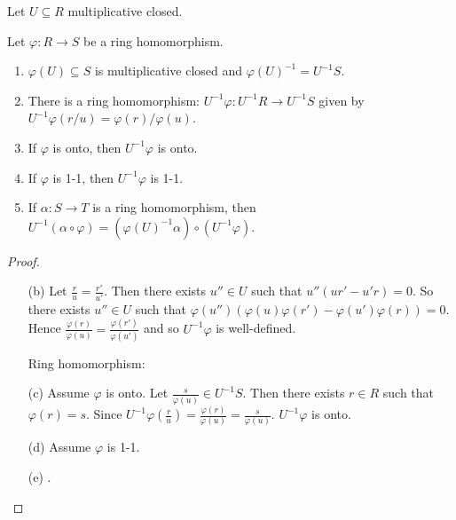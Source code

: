 Let $U \subseteq R$ multiplicative closed.

\begin{proposition}
    Let $\varphi: R \to S$ be a ring homomorphism.
    \begin{enumerate}
        \item $\varphi(U) \subseteq S$ is multiplicative closed and $\varphi(U)^{-1} = U^{-1}S$.
        \item There is a ring homomorphism: $U^{-1}\varphi: U^{-1}R \to U^{-1}S$ given by $U^{-1}\varphi(r/u) = \varphi(r)/\varphi(u)$.
            \begin{center}
            \end{center}
        \item If $\varphi$ is onto, then $U^{-1}\varphi$ is onto.
        \item If $\varphi$ is 1-1, then $U^{-1}\varphi$ is 1-1.
        \item If $\alpha: S \to T$ is a ring homomorphism, then $U^{-1}(\alpha \circ \varphi) = (\varphi(U)^{-1}\alpha) \circ (U^{-1}\varphi)$. 
            \begin{center}
                \begin{tikzcd}
                \end{tikzcd}
            \end{center}
    \end{enumerate}
\end{proposition}

\begin{proof}
    \begin{enumerate}
        \item [(b)] 
            Let $\frac{r}{u} = \frac{r'}{u'}$. Then there exists $u'' \in U$ such that $u''(ur'-u'r) = 0$. So there exists $u'' \in U$ such that $\varphi(u'')(\varphi(u)\varphi(r') - \varphi(u')\varphi(r)) = 0$. Hence $\frac{\varphi(r)}{\varphi(u)} = \frac{\varphi(r')}{\varphi(u')}$ and so $U^{-1}\varphi$ is well-defined. \par 
            Ring homomorphism: \par 
        \item [(c)]
            Assume $\varphi$ is onto. Let $\frac{s}{\varphi(u)} \in U^{-1}S$. Then there exists $r \in R$ such that $\varphi(r) = s$. Since $U^{-1}\varphi(\frac{r}{u}) = \frac{\varphi(r)}{\varphi(u)} = \frac{s}{\varphi(u)}$. $U^{-1}\varphi$ is onto.
        \item[(d)] Assume $\varphi$ is 1-1.
        \item[(e)] .
    \end{enumerate}
\end{proof}


